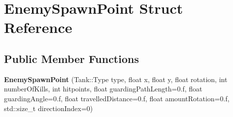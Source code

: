 \hypertarget{struct_enemy_spawn_point}{}\section{Enemy\+Spawn\+Point Struct Reference}
\label{struct_enemy_spawn_point}
\subsection*{Public Member Functions}
\begin{DoxyCompactItemize}
\item 
\hypertarget{struct_enemy_spawn_point_afd541169e2d2c338a37b36e5db701dde}{}{\bfseries Enemy\+Spawn\+Point} (Tank\+::\+Type type, float x, float y, float rotation, int number\+Of\+Kills, int hitpoints, float guarding\+Path\+Length=0.f, float guarding\+Angle=0.f, float travelled\+Distance=0.f, float amount\+Rotation=0.f, std\+::size\+\_\+t direction\+Index=0)\label{struct_enemy_spawn_point_afd541169e2d2c338a37b36e5db701dde}

\end{DoxyCompactItemize}
